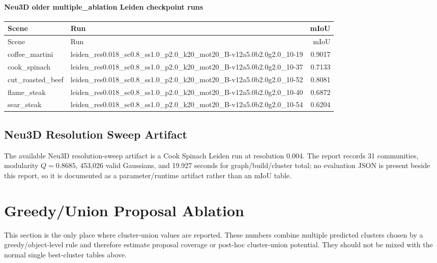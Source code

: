 \documentclass[10pt]{article}
\begin{document}
\paragraph{Neu3D older multiple\_ablation Leiden checkpoint runs}
\small
\begin{longtable}{lp{10cm}r}
\toprule
Scene & Run & mIoU \\
\midrule
\endfirsthead
\toprule
Scene & Run & mIoU \\
\midrule
\endhead
coffee\_martini & leiden\_res0.018\_sc0.8\_ss1.0\_p2.0\_k20\_mot20\_B-v12a5.0b2.0g2.0\_10-19 & 0.9017 \\
cook\_spinach & leiden\_res0.018\_sc0.8\_ss1.0\_p2.0\_k20\_mot20\_B-v12a5.0b2.0g2.0\_10-37 & 0.7133 \\
cut\_roasted\_beef & leiden\_res0.018\_sc0.8\_ss1.0\_p2.0\_k20\_mot20\_B-v12a5.0b2.0g2.0\_10-52 & 0.8081 \\
flame\_steak & leiden\_res0.018\_sc0.8\_ss1.0\_p2.0\_k20\_mot20\_B-v12a5.0b2.0g2.0\_10-40 & 0.6872 \\
sear\_steak & leiden\_res0.018\_sc0.8\_ss1.0\_p2.0\_k20\_mot20\_B-v12a5.0b2.0g2.0\_10-54 & 0.6204 \\
\bottomrule
\end{longtable}
\normalsize

\subsection{Neu3D Resolution Sweep Artifact}
The available Neu3D resolution-sweep artifact is a Cook Spinach Leiden run at resolution 0.004.  The report records 31 communities, modularity $Q=0.8685$, 453,026 valid Gaussians, and 19.927 seconds for graph/build/cluster total; no evaluation JSON is present beside this report, so it is documented as a parameter/runtime artifact rather than an mIoU table.
\section{Greedy/Union Proposal Ablation}\label{sec:proposal-ablation}
This section is the only place where cluster-union values are reported.  These numbers combine multiple predicted clusters chosen by a greedy/object-level rule and therefore estimate proposal coverage or post-hoc cluster-union potential.  They should not be mixed with the normal single best-cluster tables above.
\end{document}
